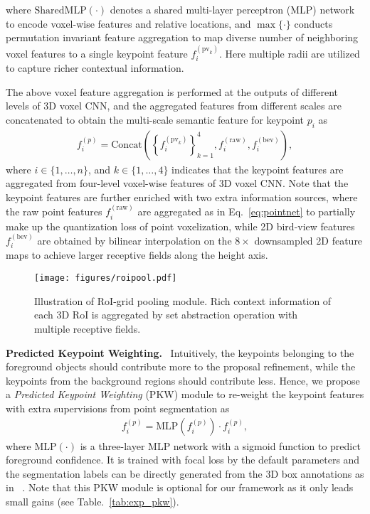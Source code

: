 \documentclass[natbib,twocolumn]{svjour3}          \smartqed  \usepackage{graphicx}
\begin{document}
\noindent 
where $\text{SharedMLP}(\cdot)$ denotes a shared multi-layer perceptron (MLP) network to encode voxel-wise features and relative locations, and $\max\{\cdot\}$ conducts permutation invariant feature aggregation to 
map diverse number of neighboring voxel features to a single keypoint feature $f_i^{(\text{pv}_k)}$.
Here multiple radii are utilized to capture richer contextual information. 

The above voxel feature aggregation is performed at the outputs of different levels of 3D voxel CNN, and the aggregated features from different scales are concatenated to obtain the multi-scale semantic feature for keypoint $p_i$ as 
\begin{align}\label{eq:keypointfeature0}
	f_i^{(p)} = \text{Concat}\left(\left\{f_i^{(\text{pv}_k)}\right\}_{k=1}^{4}, f_i^{(\text{raw})}, f_i^{(\text{bev})} \right), 
\end{align}
where $i \in \{1, \dots, n\}$, and $k \in \{1, \dots, 4\}$ indicates that the keypoint features are aggregated from four-level voxel-wise features  of 3D voxel CNN. 
Note that the keypoint features are further enriched with two extra information sources, where the raw point features $f_i^{(\text{raw})}$ are aggregated as in Eq.~\eqref{eq:pointnet} to partially make up the quantization loss of point voxelization, while 2D bird-view features $f_i^{(\text{bev})}$ are obtained by bilinear interpolation on the $8\times$ downsampled 2D feature maps to achieve larger receptive fields along the height axis.

\begin{figure}[t]
	\begin{center}
		\texttt{[image: figures/roipool.pdf]}
	\end{center}
	\vspace{-0.2cm}
	\caption{Illustration of RoI-grid pooling module. Rich context information of each 3D RoI is aggregated by set abstraction operation with multiple receptive fields.}
	\label{fig:roipool}
\end{figure}


\noindent
\textbf{Predicted Keypoint Weighting.}~
Intuitively, the keypoints belonging to the foreground objects should contribute more to the proposal refinement, while the keypoints from the background regions should contribute less.
Hence, we propose a \textit{Predicted Keypoint Weighting} (PKW) module to re-weight the keypoint features with extra supervisions from point segmentation as 
\begin{align}\label{eq:pkw}
	f_i^{(p)} = \text{MLP}(f_i^{(p)}) \cdot f_i^{(p)},
\end{align}
where $\text{MLP}(\cdot)$ is a three-layer MLP network with a sigmoid function to predict foreground confidence. 
It is trained with focal loss \citep{lin2018focal} by the default parameters and the segmentation labels can be directly generated from the 3D box annotations as in ~\citep{shi2019pointrcnn}. 
Note that this PKW module is optional for our framework as it only leads small gains (see Table.~\ref{tab:exp_pkw}).
\end{document}
